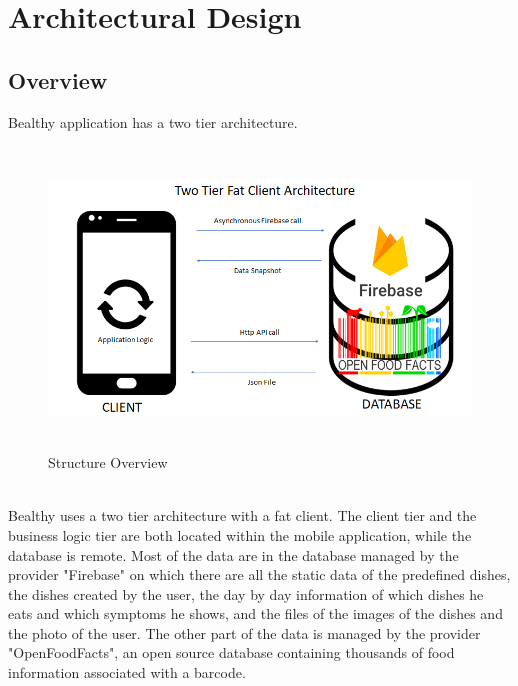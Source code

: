 \documentclass [12pt]{article}
\begin{document}
\section{Architectural Design}
\subsection{Overview}
Bealthy application has a two tier architecture.
\begin{figure}[ht!]
\centering
\includegraphics[height=8cm, width=\linewidth]{ArchitectureTwoTier.png}
\caption{Structure Overview} 
\end{figure}
\\
Bealthy uses a two tier architecture with a fat client. The client tier and the business logic tier are both located within the mobile application, while the database is remote. Most of the data are in the database managed by the provider "Firebase" on which there are all the static data of the predefined dishes, the dishes created by the user, the day by day information of which dishes he eats and which symptoms he shows, and the files of the images of the dishes and the photo of the user. The other part of the data is managed by the provider "OpenFoodFacts", an open source database containing thousands of food information associated with a barcode.
\end{document}
